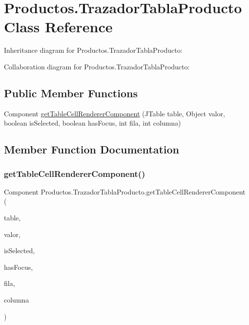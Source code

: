 \hypertarget{class_productos_1_1_trazador_tabla_producto}{}\section{Productos.\+Trazador\+Tabla\+Producto Class Reference}
\label{class_productos_1_1_trazador_tabla_producto}


Inheritance diagram for Productos.\+Trazador\+Tabla\+Producto\+:


Collaboration diagram for Productos.\+Trazador\+Tabla\+Producto\+:
\subsection*{Public Member Functions}
\begin{DoxyCompactItemize}
\item 
Component \mbox{\hyperlink{class_productos_1_1_trazador_tabla_producto_a8a749273ee90f9861310a8eb9f5179be}{get\+Table\+Cell\+Renderer\+Component}} (J\+Table table, Object valor, boolean is\+Selected, boolean has\+Focus, int fila, int columna)
\end{DoxyCompactItemize}


\subsection{Member Function Documentation}
\mbox{\label{class_productos_1_1_trazador_tabla_producto_a8a749273ee90f9861310a8eb9f5179be}} 
\subsubsection{\texorpdfstring{get\+Table\+Cell\+Renderer\+Component()}{getTableCellRendererComponent()}}
{\footnotesize\ttfamily Component Productos.\+Trazador\+Tabla\+Producto.\+get\+Table\+Cell\+Renderer\+Component (\begin{DoxyParamCaption}\item[{J\+Table}]{table,  }\item[{Object}]{valor,  }\item[{boolean}]{is\+Selected,  }\item[{boolean}]{has\+Focus,  }\item[{int}]{fila,  }\item[{int}]{columna }\end{DoxyParamCaption})\hspace{0.3cm}{\ttfamily [inline]}}


